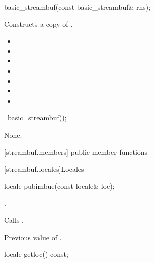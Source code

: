 %
\begin{itemdecl}
basic_streambuf(const basic_streambuf& rhs);
\end{itemdecl}

\begin{itemdescr}
\pnum
\effects Constructs a copy of .

\pnum
\postconditions

\begin{itemize}
\item {}
\item {}
\item {}
\item {}
\item {}
\item {}
\item {}
\end{itemize}
\end{itemdescr}

%
\begin{itemdecl}
~basic_streambuf();
\end{itemdecl}

\begin{itemdescr}
\pnum
\effects
None.
\end{itemdescr}

[streambuf.members]{ public member functions}

[streambuf.locales]{Locales}

%
\begin{itemdecl}
locale pubimbue(const locale& loc);
\end{itemdecl}

\begin{itemdescr}
\pnum
\postconditions
{}.

\pnum
\effects
Calls
.

\pnum
\returns
Previous value of
.
\end{itemdescr}

%
\begin{itemdecl}
locale getloc() const;
\end{itemdecl}

